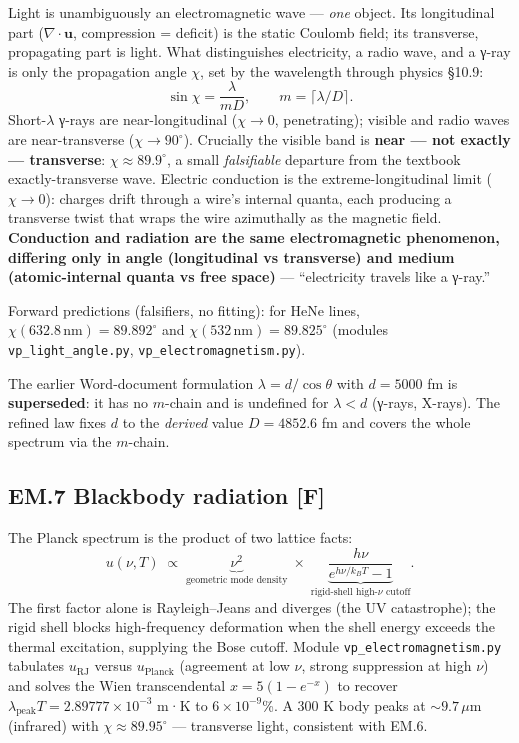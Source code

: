 \documentclass[
  10pt,
]{article}
\begin{document}
Light is unambiguously an electromagnetic wave --- \emph{one} object.
Its longitudinal part (\(\nabla\!\cdot\mathbf u\), compression =
deficit) is the static Coulomb field; its transverse, propagating part
is light. What distinguishes electricity, a radio wave, and a γ-ray is
only the propagation angle \(\chi\), set by the wavelength through
physics §10.9:
\[ \sin\chi = \frac{\lambda}{mD},\qquad m = \lceil \lambda/D\rceil. \]
Short-\(\lambda\) γ-rays are near-longitudinal (\(\chi\to 0\),
penetrating); visible and radio waves are near-transverse
(\(\chi\to 90^\circ\)). Crucially the visible band is \textbf{near ---
not exactly --- transverse}: \(\chi \approx 89.9^\circ\), a small
\emph{falsifiable} departure from the textbook exactly-transverse wave.
Electric conduction is the extreme-longitudinal limit (\(\chi\to 0\)):
charges drift through a wire's internal quanta, each producing a
transverse twist that wraps the wire azimuthally as the magnetic field.
\textbf{Conduction and radiation are the same electromagnetic
phenomenon, differing only in angle (longitudinal vs transverse) and
medium (atomic-internal quanta vs free space)} --- ``electricity travels
like a γ-ray.''

Forward predictions (falsifiers, no fitting): for HeNe lines,
\(\chi(632.8\,\text{nm}) = 89.892^\circ\) and
\(\chi(532\,\text{nm}) = 89.825^\circ\) (modules
\texttt{vp\_light\_angle.py}, \texttt{vp\_electromagnetism.py}).

The earlier Word-document formulation \(\lambda = d/\cos\theta\) with
\(d = 5000\) fm is \textbf{superseded}: it has no \(m\)-chain and is
undefined for \(\lambda < d\) (γ-rays, X-rays). The refined law fixes
\(d\) to the \emph{derived} value \(D = 4852.6\) fm and covers the whole
spectrum via the \(m\)-chain.

\hypertarget{em.7-blackbody-radiation-f}{%
\subsection{\texorpdfstring{EM.7 Blackbody radiation
\textbf{{[}F{]}}}{EM.7 Blackbody radiation {[}F{]}}}\label{em.7-blackbody-radiation-f}}

The Planck spectrum is the product of two lattice facts:
\[ u(\nu,T) \;\propto\; \underbrace{\nu^2}_{\text{geometric mode density}}\;\times\;
   \underbrace{\frac{h\nu}{e^{h\nu/k_BT}-1}}_{\text{rigid-shell high-}\nu\text{ cutoff}}. \]
The first factor alone is Rayleigh--Jeans and diverges (the UV
catastrophe); the rigid shell blocks high-frequency deformation when the
shell energy exceeds the thermal excitation, supplying the Bose cutoff.
Module \texttt{vp\_electromagnetism.py} tabulates \(u_{\mathrm{RJ}}\)
versus \(u_{\mathrm{Planck}}\) (agreement at low \(\nu\), strong
suppression at high \(\nu\)) and solves the Wien transcendental
\(x = 5(1-e^{-x})\) to recover
\(\lambda_{\text{peak}}T = 2.89777\times 10^{-3}\) m·K to
\(6\times 10^{-9}\)\%. A 300 K body peaks at \(\sim 9.7\,\mu\)m
(infrared) with \(\chi \approx 89.95^\circ\) --- transverse light,
consistent with EM.6.
\end{document}

